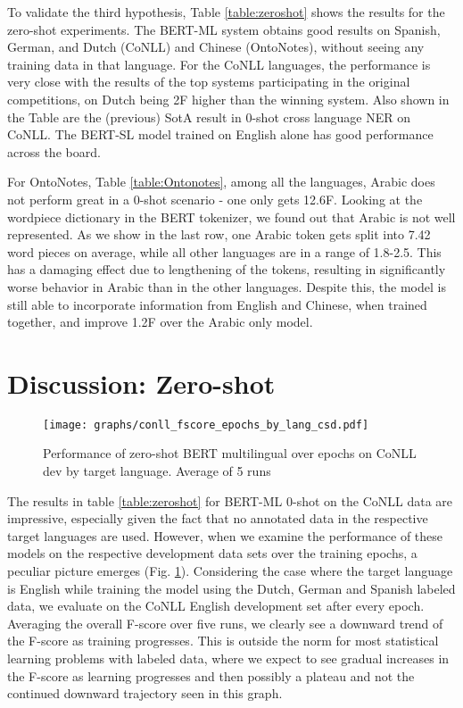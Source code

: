 \documentclass[letterpaper]{article} \usepackage{aaai20}  \usepackage{times}  \usepackage{helvet} \usepackage{courier}  \usepackage[hyphens]{url}  \usepackage{graphicx} \urlstyle{rm} \def\UrlFont{\rm}  \usepackage{graphicx}  \frenchspacing  \setlength{\pdfpagewidth}{8.5in}  \setlength{\pdfpageheight}{11in}  \usepackage{amsmath}
\begin{document}
To validate the third hypothesis, Table \ref{table:zeroshot} shows the
results for the zero-shot experiments. The BERT-ML system obtains good
results on Spanish, German, and Dutch (CoNLL) and Chinese (OntoNotes),
without seeing any training data in that language. For the CoNLL
languages, the performance is very close with the results of the top
systems participating in the original competitions, on Dutch being 2F
higher than the winning system. Also shown in the Table are the
(previous) SotA result in 0-shot cross language NER on CoNLL. The
BERT-SL model trained on English alone has good performance
across the board.

For OntoNotes, Table \ref{table:Ontonotes}, among all the languages, Arabic does not perform great in a 0-shot
scenario - one only gets 12.6F. Looking at the wordpiece dictionary in
the BERT tokenizer, we found out that Arabic is not well
represented. As we show in the last row, one Arabic
token gets split into 7.42 word pieces on average, while all other
languages are in a range of 1.8-2.5. This has a damaging effect due to
lengthening of the tokens, resulting in significantly worse behavior in
Arabic than in the other languages. Despite this, the model is
still able to incorporate information from English and Chinese, when
trained together, and improve 1.2F over the Arabic only model.

 \section{Discussion: Zero-shot\label{sec:exp:zer}}

\begin{figure}
\begin{center}
\texttt{[image: graphs/conll\_fscore\_epochs\_by\_lang\_csd.pdf]}
\end{center}
\caption{Performance of zero-shot BERT multilingual over epochs on CoNLL dev by
  target language. Average of 5 runs}
\label{fig:conll_fscore_epochs_by_lang_csd}
\end{figure}

The results in table \ref{table:zeroshot} for BERT-ML 0-shot on the
CoNLL data are impressive, especially given the fact that no annotated
data in the respective target languages are used. However, when we
examine the performance of these models on the respective development
data sets over the training epochs, a peculiar picture emerges (Fig.
\ref{fig:conll_fscore_epochs_by_lang_csd}). Considering the case where the target language
is English while training the model using the Dutch, German and
Spanish labeled data, we evaluate on the CoNLL English development set after
every epoch. Averaging the overall F-score over five runs, we
clearly see a downward trend of the F-score as training progresses. This
is outside the norm for most statistical learning problems with labeled
data, where we expect to see gradual increases in the F-score as
learning progresses and then possibly a plateau and not the continued downward
trajectory seen in this graph.
\end{document}
